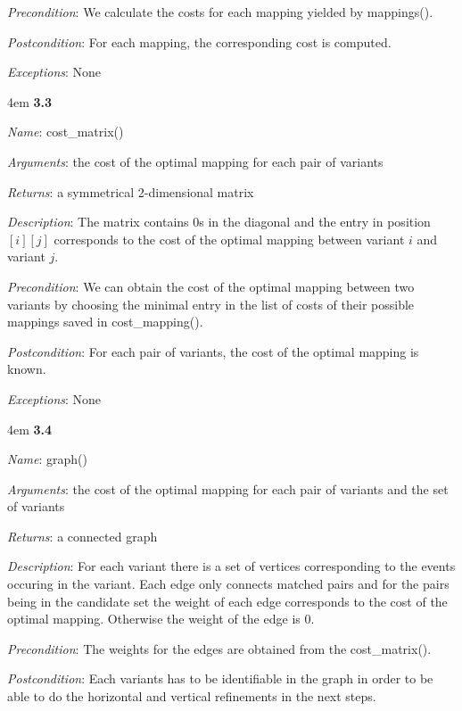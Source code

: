 \documentclass[notitlepage]{article}
\begin{document}
\begin{flushleft}
\textit{Precondition}: We calculate the costs for each mapping yielded by mappings().

\textit{Postcondition}: For each mapping, the corresponding cost is computed.

\textit{Exceptions}: None
\par
\endgroup


\medskip

\par
\begingroup
\leftskip4em
\textbf{3.3} 

\textit{Name}: cost\_matrix()

\textit{Arguments}: the cost of the optimal mapping for each pair of variants

\textit{Returns}: a symmetrical 2-dimensional matrix

\textit{Description}: The matrix contains 0s in the diagonal and the entry in position $[i][j]$ corresponds to the cost of the optimal mapping between variant $i$ and variant $j$. 

\textit{Precondition}: We can obtain the cost of the optimal mapping between two variants by choosing the minimal entry in the list of costs of their possible mappings saved in cost\_mapping().

\textit{Postcondition}: For each pair of variants, the cost of the optimal mapping is known.

\textit{Exceptions}: None
\par
\endgroup


\medskip

\par
\begingroup
\leftskip4em
\textbf{3.4} 

\textit{Name}: graph()

\textit{Arguments}: the cost of the optimal mapping for each pair of variants and the set of variants

\textit{Returns}: a connected graph

\textit{Description}: For each variant there is a set of vertices corresponding to the events occuring in the variant. Each edge only connects matched pairs and for the pairs being in the candidate set the weight of each edge corresponds to the cost of the optimal mapping. Otherwise the weight of the edge is 0.

\textit{Precondition}: The weights for the edges are obtained from the cost\_matrix().

\textit{Postcondition}: Each variants has to be identifiable in the graph in order to be able to do the horizontal and vertical refinements in the next steps.


\end{flushleft}
\end{document}
